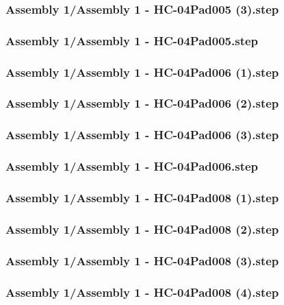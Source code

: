 \documentclass[a4paper,12pt]{article}
\begin{document}
\subsubsection{Assembly 1/Assembly 1 - HC-04Pad005 (3).step}

\subsubsection{Assembly 1/Assembly 1 - HC-04Pad005.step}

\subsubsection{Assembly 1/Assembly 1 - HC-04Pad006 (1).step}

\subsubsection{Assembly 1/Assembly 1 - HC-04Pad006 (2).step}

\subsubsection{Assembly 1/Assembly 1 - HC-04Pad006 (3).step}

\subsubsection{Assembly 1/Assembly 1 - HC-04Pad006.step}

\subsubsection{Assembly 1/Assembly 1 - HC-04Pad008 (1).step}

\subsubsection{Assembly 1/Assembly 1 - HC-04Pad008 (2).step}

\subsubsection{Assembly 1/Assembly 1 - HC-04Pad008 (3).step}

\subsubsection{Assembly 1/Assembly 1 - HC-04Pad008 (4).step}

\end{document}
